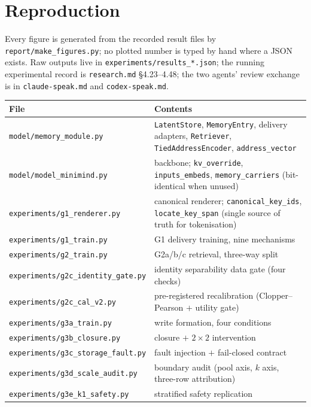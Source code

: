 \documentclass[11pt, a4paper]{article}
\begin{document}
\appendix
\section{Reproduction}

Every figure is generated from the recorded result files by
\verb|report/make_figures.py|; no plotted number is typed by hand where a JSON exists.
Raw outputs live in \verb|experiments/results_*.json|; the running experimental record is
\verb|research.md| \S4.23--4.48; the two agents' review exchange is in
\verb|claude-speak.md| and \verb|codex-speak.md|.

\begin{longtable}{p{} p{}}
\toprule
File & Contents \\
\midrule
\endhead
\verb|model/memory_module.py| & \verb|LatentStore|, \verb|MemoryEntry|, delivery adapters,
\verb|Retriever|, \verb|TiedAddressEncoder|, \verb|address_vector| \\
\verb|model/model_minimind.py| & backbone; \verb|kv_override|, \verb|inputs_embeds|,
\verb|memory_carriers| (bit-identical when unused) \\
\verb|experiments/g1_renderer.py| & canonical renderer; \verb|canonical_key_ids|,
\verb|locate_key_span| (single source of truth for tokenisation) \\
\verb|experiments/g1_train.py| & G1 delivery training, nine mechanisms \\
\verb|experiments/g2_train.py| & G2a/b/c retrieval, three-way split \\
\verb|experiments/g2c_identity_gate.py| & identity separability data gate (four checks) \\
\verb|experiments/g2c_cal_v2.py| & pre-registered recalibration (Clopper--Pearson $+$ utility gate) \\
\verb|experiments/g3a_train.py| & write formation, four conditions \\
\verb|experiments/g3b_closure.py| & closure $+$ $2\times2$ intervention \\
\verb|experiments/g3c_storage_fault.py| & fault injection $+$ fail-closed contract \\
\verb|experiments/g3d_scale_audit.py| & boundary audit (pool axis, $k$ axis, three-row attribution) \\
\verb|experiments/g3e_k1_safety.py| & stratified safety replication \\

\end{longtable}
\end{document}
